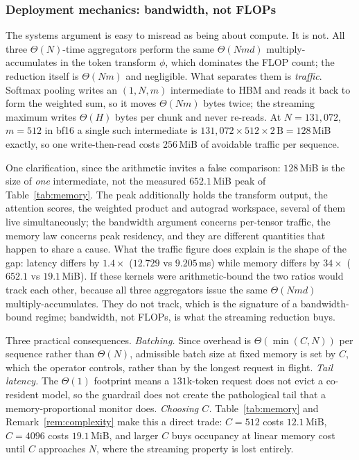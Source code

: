 \documentclass[10pt]{article}
\theoremstyle{plain}
\theoremstyle{definition}
\theoremstyle{remark}
\begin{document}
\subsubsection{Deployment mechanics: bandwidth, not FLOPs}
\label{sec:deployment}

The systems argument is easy to misread as being about compute. It is not. All three
$\Theta(N)$-time aggregators perform the same $\Theta(Nmd)$ multiply-accumulates in the
token transform $\phi$, which dominates the FLOP count; the reduction itself is $\Theta(Nm)$
and negligible. What separates them is \emph{traffic}. Softmax pooling writes an
$(1,N,m)$ intermediate to HBM and reads it back to form the weighted sum, so it moves
$\Theta(Nm)$ bytes twice; the streaming maximum writes $\Theta(H)$ bytes per chunk and
never re-reads. At $N{=}131{,}072$, $m{=}512$ in bf16 a single such intermediate is
$131{,}072\times512\times2\,\text{B}=128$\,MiB exactly, so one write-then-read costs
$256$\,MiB of avoidable traffic per sequence.

One clarification, since the arithmetic invites a false comparison: $128$\,MiB is the size
of \emph{one} intermediate, not the measured $652.1$\,MiB peak of Table~\ref{tab:memory}.
The peak additionally holds the transform output, the attention scores, the weighted
product and autograd workspace, several of them live simultaneously; the bandwidth
argument concerns per-tensor traffic, the memory law concerns peak residency, and they are
different quantities that happen to share a cause. What the traffic figure does explain is
the shape of the gap: latency differs by $1.4\times$ ($12.729$ vs $9.205$\,ms) while memory
differs by $34\times$ ($652.1$ vs $19.1$\,MiB). If these kernels were arithmetic-bound the
two ratios would track each other, because all three aggregators issue the same
$\Theta(Nmd)$ multiply-accumulates. They do not track, which is the signature of a
bandwidth-bound regime; bandwidth, not FLOPs, is what the streaming reduction buys.

Three practical consequences. \emph{Batching.} Since overhead is $\Theta(\min(C,N))$ per
sequence rather than $\Theta(N)$, admissible batch size at fixed memory is set by $C$, which
the operator controls, rather than by the longest request in flight. \emph{Tail latency.}
The $\Theta(1)$ footprint means a $131$k-token request does not evict a co-resident model,
so the guardrail does not create the pathological tail that a memory-proportional monitor
does. \emph{Choosing $C$.} Table~\ref{tab:memory} and Remark~\ref{rem:complexity} make this
a direct trade: $C{=}512$ costs $12.1$\,MiB, $C{=}4096$ costs $19.1$\,MiB, and larger $C$
buys occupancy at linear memory cost until $C$ approaches $N$, where the streaming property
is lost entirely.
\end{document}
